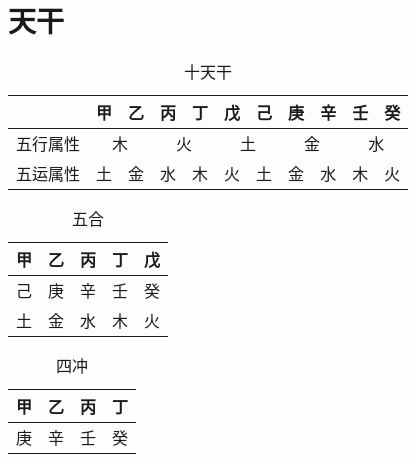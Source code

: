 \section{天干}

\begin{table}[h]
  \centering
  \caption{十天干}
  \begin{tabular}{|c|c|c|c|c|c|c|c|c|c|c|}
    \hline & 甲 & 乙 & 丙 & 丁 & 戊 & 己 & 庚 & 辛 & 壬 & 癸 \\
    \hline 五行属性 & \multicolumn{2}{c|}{木} & \multicolumn{2}{c|}{火} & \multicolumn{2}{c|}{土} & \multicolumn{2}{c|}{金} & \multicolumn{2}{c|}{水} \\
    \hline 五运属性 & 土 & 金 & 水 & 木 & 火 & 土 & 金 & 水 & 木 & 火 \\
    \hline
  \end{tabular}
\end{table}

\begin{table}[h]
  \centering
  \caption[]{五合\footnotemark}
  \begin{tabular}{|c|c|c|c|c|}
    \hline 甲 & 乙 & 丙 & 丁 & 戊 \\
    \hline 己 & 庚 & 辛 & 壬 & 癸 \\
    \hline 土 & 金 & 水 & 木 & 火 \\
    \hline
  \end{tabular}
\end{table}

\begin{table}[h]
  \centering
  \caption[]{四冲\footnotemark}
  \begin{tabular}{|c|c|c|c|}
    \hline 甲 & 乙 & 丙 & 丁 \\
    \hline 庚 & 辛 & 壬 & 癸 \\
    \hline
  \end{tabular}
\end{table}
